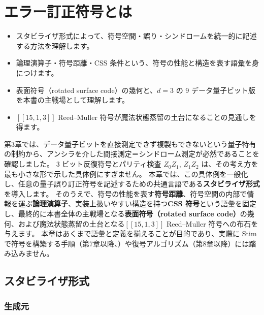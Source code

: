 \chapter{エラー訂正符号とは}\label{ch:qec_codes}

\begin{chaptergoal}
  \begin{itemize}
  \item スタビライザ形式によって、符号空間・誤り・シンドロームを統一的に記述する方法を理解します。
  \item 論理演算子・符号距離・CSS 条件という、符号の性能と構造を表す語彙を身につけます。
  \item 表面符号（rotated surface code）の幾何と、$d=3$ の 9 データ量子ビット版を本書の主戦場として理解します。
  \item $[[15,1,3]]$ Reed–Muller 符号が魔法状態蒸留の土台になることの見通しを得ます。
  \end{itemize}
\end{chaptergoal}

第3章では、データ量子ビットを直接測定できず複製もできないという量子特有の制約から、アンシラを介した間接測定＝シンドローム測定が必然であることを確認しました。
3 ビット反復符号とパリティ検査 $Z_0Z_1$, $Z_1Z_2$ は、その考え方を最も小さな形で示した具体例にすぎません。
本章では、この具体例を一般化し、任意の量子誤り訂正符号を記述するための共通言語である\textbf{スタビライザ形式}を導入します。
そのうえで、符号の性能を表す\textbf{符号距離}、符号空間の内部で情報を運ぶ\textbf{論理演算子}、実装上扱いやすい構造を持つ\textbf{CSS 符号}という語彙を固定し、最終的に本書全体の主戦場となる\textbf{表面符号（rotated surface code）}の幾何、および魔法状態蒸留の土台となる$[[15,1,3]]$ Reed–Muller 符号への布石を与えます。
本章はあくまで語彙と定義を揃えることが目的であり、実際に Stim で符号を構築する手順（第7章以降、）や復号アルゴリズム（第8章以降）には踏み込みません。

\section{スタビライザ形式}\label{sec:stabilizer}

\subsection{生成元}

